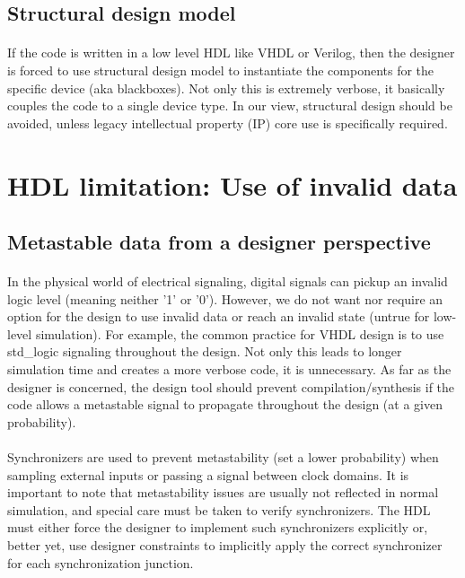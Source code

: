 \subsection*{Structural design model} 
\paragraph{}If the code is written in a low level HDL like VHDL or Verilog, then the designer is forced to use structural design model to instantiate the components for the specific device (aka blackboxes). Not only this is extremely verbose, it basically couples the code to a single device type. In our view, structural design should be avoided, unless legacy intellectual property (IP) core use is specifically required.  


\section{HDL limitation: Use of invalid data}
\label{sec:limitation invalid}
\subsection*{Metastable data from a designer perspective} 
\paragraph{}In the physical world of electrical signaling, digital signals can pickup an invalid logic level (meaning neither '1' or '0'). However, we do not want nor require an option for the design to use invalid data or reach an invalid state (untrue for low-level simulation). For example, the common practice for VHDL design is to use std\_logic signaling throughout the design. Not only this leads to longer simulation time and creates a more verbose code, it is unnecessary. As far as the designer is concerned, the design tool should prevent compilation/synthesis if the code allows a metastable signal to propagate throughout the design (at a given probability). 
\paragraph{}Synchronizers are used to prevent metastability (set a lower probability) when sampling external inputs or passing a signal between clock domains. It is important to note that metastability issues are usually not reflected in normal simulation, and special care must be taken to verify synchronizers. The HDL must either force the designer to implement such synchronizers explicitly or, better yet, use designer constraints to implicitly apply the correct synchronizer for each synchronization junction. 

